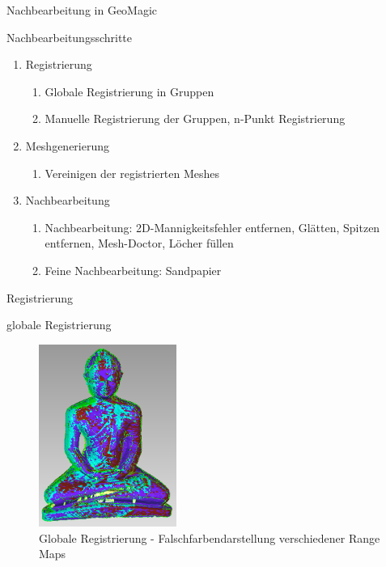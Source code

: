 \documentclass[11pt]{beamer}
\begin{document}
\begin{frame}{Nachbearbeitung in GeoMagic}

\begin{block}{Nachbearbeitungsschritte}
\begin{enumerate}
\item Registrierung
\begin{enumerate}
\item Globale Registrierung in Gruppen
\item Manuelle Registrierung der Gruppen, n-Punkt Registrierung
\end{enumerate}
\item Meshgenerierung
\begin{enumerate}
\item Vereinigen der registrierten Meshes
\end{enumerate}
\item Nachbearbeitung
\begin{enumerate}
\item Nachbearbeitung: 2D-Mannigkeitsfehler entfernen, Glätten, Spitzen entfernen, Mesh-Doctor, Löcher füllen
\item Feine Nachbearbeitung: Sandpapier
\end{enumerate}
\end{enumerate}
\end{block}

\end{frame}

\begin{frame}{Registrierung}

\begin{block}{globale Registrierung}
\begin{figure}[H]
\centering
\includegraphics[width=0.4\textwidth]{images/GeoMagicBudhaPictures/Budha_Scans_Aufrecht_globalRegistration_2.PNG}
\caption{Globale Registrierung - Falschfarbendarstellung verschiedener Range Maps}
\label{fig:budhaGlobal}
\end{figure}
\end{block}

\end{frame}
\end{document}
